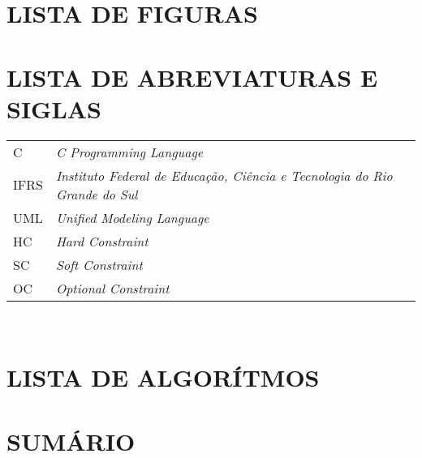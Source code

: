 \documentclass[12pt,a4paper]{article}
\begin{document}
	\listoftables

	\newpage

	\thispagestyle{empty}
	\section*{LISTA DE FIGURAS}

	\listoffigures

	\newpage


	\thispagestyle{empty}
	\section*{LISTA DE ABREVIATURAS E SIGLAS}

	\begin{tabular}{p{3cm} p{}}
	  C & \textit{C Programming Language} \\
	  IFRS & \textit{Instituto Federal de Educação, Ciência e Tecnologia do Rio Grande do Sul} \\
	  UML & \textit{Unified Modeling Language} \\
	  HC & \textit{Hard Constraint} \\
	  SC & \textit{Soft Constraint} \\
	  OC & \textit{Optional Constraint}
	\end{tabular}\\


	\newpage


	\thispagestyle{empty}
	\section*{LISTA DE ALGORÍTMOS}


	\newpage



	\thispagestyle{empty}
	\section*{SUMÁRIO}
\end{document}
